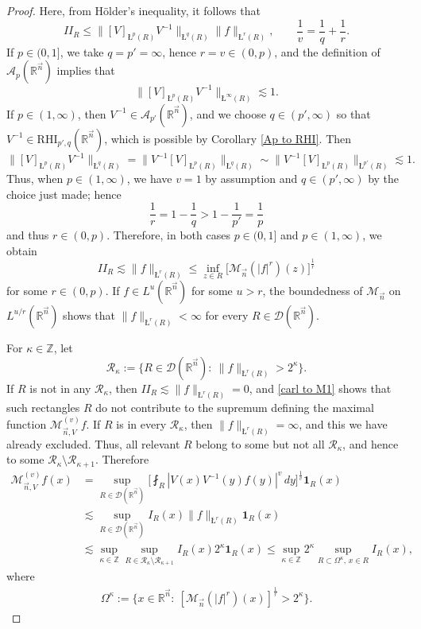 \documentclass[11pt, reqno]{amsart}
\theoremstyle{definition}
\theoremstyle{remark}
\numberwithin{equation}{section}
\newcommand{\A}{\mathscr A}
\newcommand{\D}{\mathscr D}
\newcommand{\R}{\mathbb R}
\newcommand{\Rs}{\mathscr R}
\newcommand{\Z}{\mathbb Z}
\newcommand{\vn}{\vec n}
\newcommand{\one}{\mathbf{1}}
\newcommand{\aveL}{\textit{\L}}
\newcommand{\abs}[1]{|#1|}
\newcommand{\Norm}[2]{\|#1\|_{#2}}
\newcommand{\RHI}{\mathrm{RHI}}
\begin{document}
\begin{proof}
Here, from H\"older's inequality, it follows that
\begin{equation*}
II_R\leq\Norm{[V]_{\aveL^p(R)}V^{-1}}{\aveL^q(R)}\Norm{f}{\aveL^r(R)},
\qquad\frac{1}{v}=\frac{1}{q}+\frac{1}{r}.
\end{equation*}
If $p\in(0,1]$, we take $q=p'=\infty$, hence $r=v\in(0,p)$, and the definition of $\A_p(\R^{\vn})$ implies that
\begin{equation*}
\Norm{[V]_{\aveL^p(R)}V^{-1}}{\aveL^\infty(R)}\lesssim 1.
\end{equation*}
If $p\in(1,\infty)$, then $V^{-1}\in\A_{p'}(\R^{\vn})$, and we choose $q\in(p',\infty)$ so that $V^{-1}\in\RHI_{p',q}(\R^{\vn})$, which is possible by Corollary \ref{Ap to RHI}. Then
\begin{equation*}
\Norm{[V]_{\aveL^p(R)}V^{-1}}{\aveL^q(R)}
=\Norm{V^{-1}[V]_{\aveL^p(R)}}{\aveL^q(R)}
\sim\Norm{V^{-1}[V]_{\aveL^p(R)}}{\aveL^{p'}(R)}\lesssim 1.
\end{equation*}
Thus, when $p\in(1,\infty)$, we have $v=1$ by assumption and $q\in(p',\infty)$ by the choice just made; hence
\begin{equation*}
\frac{1}{r}=1-\frac{1}{q}>1-\frac{1}{p'}=\frac{1}{p}
\end{equation*}
and thus $r\in(0,p)$. Therefore, in both cases $p\in(0,1]$ and $p\in(1,\infty)$, we obtain
\begin{equation*}
II_R\lesssim \Norm{f}{\aveL^r(R)}\leq\inf_{z\in R}
\Big[\mathcal M_{\vn}(\abs{f}^r)(z)\Big]^{\frac 1r}
\end{equation*}
for some $r\in(0,p)$. If $f\in L^u(\R^{\vn})$ for some $u>r$, the boundedness of $\mathcal M_{\vn}$ on $L^{u/r}(\R^{\vn})$ shows that $\Norm{f}{\aveL^r(R)}<\infty$ for every $R\in\D(\R^{\vn})$.

For $\kappa\in\Z$, let
\begin{equation*}
\Rs_\kappa:=\{R\in\D(\R^{\vn}):\
\Norm{f}{\aveL^r(R)}>2^\kappa\}.
\end{equation*}
If $R$ is not in any $\Rs_\kappa$, then $II_R\lesssim\Norm{f}{\aveL^r(R)}=0$, and \eqref{carl to M1} shows that such rectangles $R$ do not contribute to the supremum defining the maximal function $\mathcal M_{\vn,V}^{(v)}f$. If $R$ is in every $\Rs_\kappa$, then $\Norm{f}{\aveL^r(R)}=\infty$, and this we have already excluded. Thus, all relevant $R$ belong to some but not all $\Rs_\kappa$, and hence to some $\Rs_\kappa\setminus\Rs_{\kappa+1}$. Therefore
\begin{align*}
\mathcal M_{\vn,V}^{(v)}f(x)
&=\sup_{R\in\D(\R^{\vn})} \bigg[\fint_R\abs{V(x)V^{-1}(y)f(y)}^v \, dy
\bigg]^{\frac 1v} \one_R(x) \\
&\lesssim\sup_{R\in\D(\R^{\vn})} I_R(x) \Norm{f}{\aveL^r(R)} \one_R(x) \\
&\lesssim\sup_{\kappa\in\Z}\sup_{R\in\Rs_\kappa\setminus\Rs_{\kappa+1}} I_R(x) 2^\kappa \one_R(x)
\leq\sup_{\kappa\in\Z}2^{\kappa}
\sup_{R\subset\Omega^\kappa,\, x\in R} I_R(x),
\end{align*}
where
\begin{align*}
\Omega^\kappa:=\Big\{x\in\R^{\vn}:\
[\mathcal M_{\vn}(\abs{f}^r)(x)]^{\frac 1r}>2^\kappa\Big\}.
\end{align*}


\end{proof}
\end{document}
